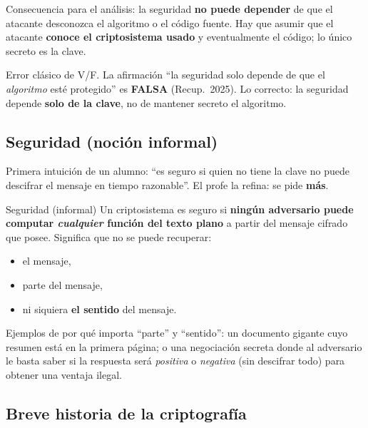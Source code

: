 \documentclass[../main.tex]{subfiles}
\begin{document}
Consecuencia para el análisis: la seguridad \textbf{no puede depender} de que
el atacante desconozca el algoritmo o el código fuente. Hay que asumir que el
atacante \textbf{conoce el criptosistema usado} y eventualmente el código; lo
único secreto es la clave.

\begin{ojo}
Error clásico de V/F. La afirmación ``la seguridad solo depende de que el
\emph{algoritmo} esté protegido'' es \textbf{FALSA} (Recup.\ 2025). Lo correcto:
la seguridad depende \textbf{solo de la clave}, no de mantener secreto el
algoritmo.
\end{ojo}

\subsection{Seguridad (noción informal)}

Primera intuición de un alumno: ``es seguro si quien no tiene la clave no puede
descifrar el mensaje en tiempo razonable''. El profe la refina: se pide
\textbf{más}.

\begin{definicion}{Seguridad (informal)}
Un criptosistema es seguro si \textbf{ningún adversario puede computar
\emph{cualquier} función del texto plano} a partir del mensaje cifrado que posee.
Significa que no se puede recuperar:
\begin{itemize}[nosep]
  \item el mensaje,
  \item parte del mensaje,
  \item ni siquiera \textbf{el sentido} del mensaje.
\end{itemize}
\end{definicion}


Ejemplos de por qué importa ``parte'' y ``sentido'': un documento gigante cuyo
resumen está en la primera página; o una negociación secreta donde al adversario
le basta saber si la respuesta será \emph{positiva} o \emph{negativa} (sin
descifrar todo) para obtener una ventaja ilegal.

\subsection{Breve historia de la criptografía}
\end{document}
